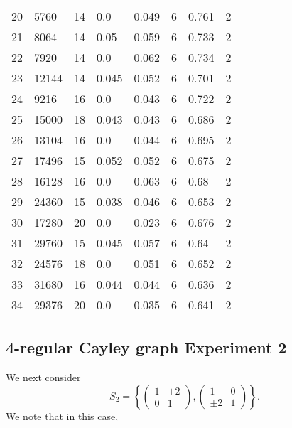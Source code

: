 \begin{center}
\begin{tabular}{ p{1cm}|p{1cm}|p{1cm}|p{1cm}|p{1cm}|p{1cm}|p{1cm}|p{1cm} }
		20 & 5760 & 14 &  0.0 & 0.049 & 6 & 0.761 & 2 \\
		21 & 8064 & 14 &  0.05 & 0.059 & 6 & 0.733 & 2 \\
		22 & 7920 & 14 &  0.0 & 0.062 & 6 & 0.734 & 2 \\
		23 & 12144 & 14 &  0.045 & 0.052 & 6 & 0.701 & 2 \\
		24 & 9216 & 16 &  0.0 & 0.043 & 6 & 0.722 & 2 \\
		25 & 15000 & 18 &  0.043 & 0.043 & 6 & 0.686 & 2 \\
		26 & 13104 & 16 &  0.0 & 0.044 & 6 & 0.695 & 2 \\
		27 & 17496 & 15 &  0.052 & 0.052 & 6 & 0.675 & 2 \\
		28 & 16128 & 16 &  0.0 & 0.063 & 6 & 0.68 & 2 \\
		29 & 24360 & 15 &  0.038 & 0.046 & 6 & 0.653 & 2 \\
		30 & 17280 & 20 &  0.0 & 0.023 & 6 & 0.676 & 2 \\
		31 & 29760 & 15 &  0.045 & 0.057 & 6 & 0.64 & 2 \\
		32 & 24576 & 18 &  0.0 & 0.051 & 6 & 0.652 & 2 \\
		33 & 31680 & 16 &  0.044 & 0.044 & 6 & 0.636 & 2 \\
		34 & 29376 & 20 &  0.0 & 0.035 & 6 & 0.641 & 2 
	\end{tabular}
\end{center}

\newpage 

\subsection{4-regular Cayley graph Experiment 2}

We next consider
$$S_2 = \left\{  \begin{pmatrix}
1 & \pm 2 \\ 0 & 1
\end{pmatrix}, \begin{pmatrix}
1 & 0 \\ \pm 2 & 1
\end{pmatrix}  \right\}.$$ We note that in this case,  

\vspace{2em}

